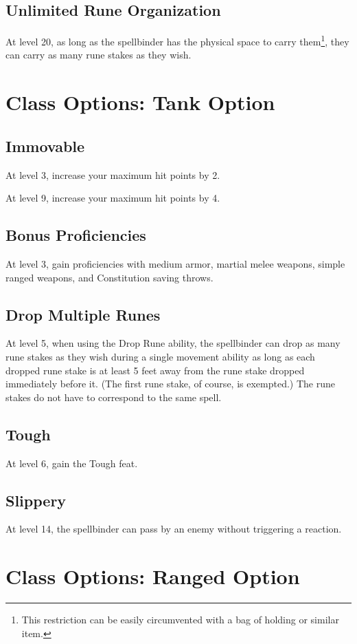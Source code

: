 \subsection{Unlimited Rune Organization}
At level 20, as long as the spellbinder has the physical space to carry them\footnote{This restriction can be easily circumvented with a bag of holding or similar item.}, they can carry as many rune stakes as they wish.

\section{Class Options: Tank Option}
\subsection{Immovable}
At level 3, increase your maximum hit points by 2.

At level 9, increase your maximum hit points by 4.

\subsection{Bonus Proficiencies}
At level 3, gain proficiencies with medium armor, martial melee weapons, simple ranged weapons, and Constitution saving throws.

\subsection{Drop Multiple Runes}
At level 5, when using the Drop Rune ability, the spellbinder can drop as many rune stakes as they wish during a single movement ability as long as each dropped rune stake is at least 5 feet away from the rune stake dropped immediately before it. (The first rune stake, of course, is exempted.) The rune stakes do not have to correspond to the same spell.

\subsection{Tough}
At level 6, gain the Tough feat.

\subsection{Slippery}
At level 14, the spellbinder can pass by an enemy without triggering a reaction.

\section{Class Options: Ranged Option}
